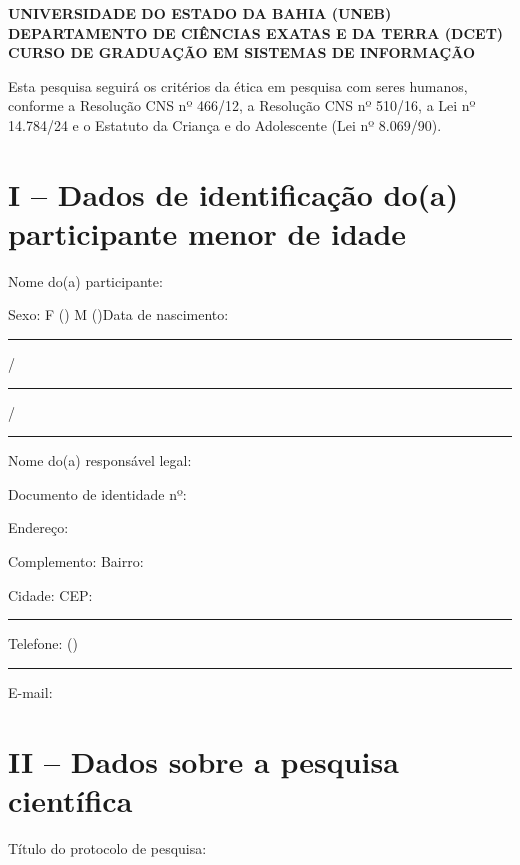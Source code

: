 \label{ap:tcle-responsavel}

\begin{center}
    \textbf{UNIVERSIDADE DO ESTADO DA BAHIA (UNEB)}\\[0.2cm]
    \textbf{DEPARTAMENTO DE CIÊNCIAS EXATAS E DA TERRA (DCET)}\\[0.2cm]
    \textbf{CURSO DE GRADUAÇÃO EM SISTEMAS DE INFORMAÇÃO}
\end{center}

\noindent Esta pesquisa seguirá os critérios da ética em pesquisa com seres humanos, conforme a Resolução CNS nº 466/12, a Resolução CNS nº 510/16, a Lei nº 14.784/24 e o Estatuto da Criança e do Adolescente (Lei nº 8.069/90).

\section{I -- Dados de identificação do(a) participante menor de idade}

\noindent Nome do(a) participante: \hrulefill

\noindent Sexo: F (\hspace{0.6cm}) M (\hspace{0.6cm})\hspace{1.5cm}Data de nascimento: \rule{1.2cm}{0.4pt}/\rule{1.2cm}{0.4pt}/\rule{1.8cm}{0.4pt}

\noindent Nome do(a) responsável legal: \hrulefill

\noindent Documento de identidade nº: \hrulefill

\noindent Endereço: \hrulefill

\noindent Complemento: \hrulefill\hspace{0.4cm}Bairro: \hrulefill

\noindent Cidade: \hrulefill\hspace{0.4cm}CEP: \rule{2.5cm}{0.4pt}

\noindent Telefone: (\hspace{0.6cm})\rule{2cm}{0.4pt}\hspace{0.8cm}E-mail: \hrulefill

\section{II -- Dados sobre a pesquisa científica}

\noindent Título do protocolo de pesquisa: \imprimirtitulo

